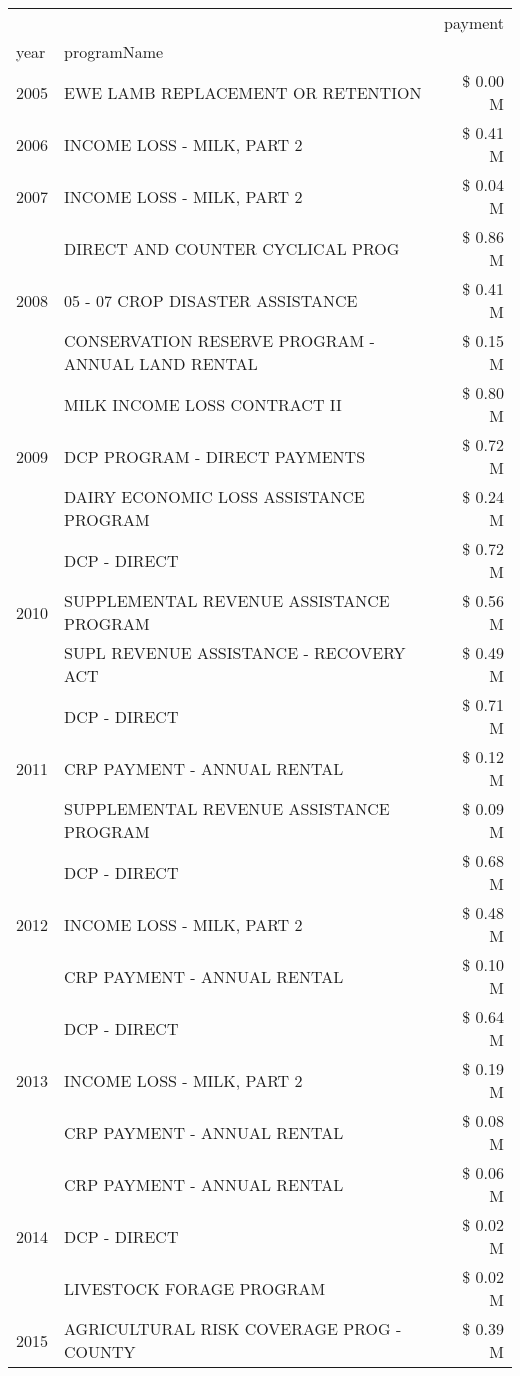 \begin{tabular}{llr}
\toprule
 &  & payment \\
year & programName &  \\
\midrule
2005 & EWE LAMB REPLACEMENT OR RETENTION & \$ 0.00 M \\
\cline{1-3}
2006 & INCOME LOSS - MILK, PART 2 & \$ 0.41 M \\
\cline{1-3}
2007 & INCOME LOSS - MILK, PART 2 & \$ 0.04 M \\
\cline{1-3}
\multirow[t]{3}{*}{2008} & DIRECT AND COUNTER CYCLICAL PROG & \$ 0.86 M \\
 & 05 - 07 CROP DISASTER ASSISTANCE & \$ 0.41 M \\
 & CONSERVATION RESERVE PROGRAM - ANNUAL LAND RENTAL & \$ 0.15 M \\
\cline{1-3}
\multirow[t]{3}{*}{2009} & MILK INCOME LOSS CONTRACT II & \$ 0.80 M \\
 & DCP PROGRAM - DIRECT PAYMENTS & \$ 0.72 M \\
 & DAIRY ECONOMIC LOSS ASSISTANCE PROGRAM & \$ 0.24 M \\
\cline{1-3}
\multirow[t]{3}{*}{2010} & DCP - DIRECT & \$ 0.72 M \\
 & SUPPLEMENTAL REVENUE ASSISTANCE PROGRAM & \$ 0.56 M \\
 & SUPL REVENUE ASSISTANCE - RECOVERY ACT & \$ 0.49 M \\
\cline{1-3}
\multirow[t]{3}{*}{2011} & DCP - DIRECT & \$ 0.71 M \\
 & CRP PAYMENT - ANNUAL RENTAL & \$ 0.12 M \\
 & SUPPLEMENTAL REVENUE ASSISTANCE PROGRAM & \$ 0.09 M \\
\cline{1-3}
\multirow[t]{3}{*}{2012} & DCP - DIRECT & \$ 0.68 M \\
 & INCOME LOSS - MILK, PART 2 & \$ 0.48 M \\
 & CRP PAYMENT - ANNUAL RENTAL & \$ 0.10 M \\
\cline{1-3}
\multirow[t]{3}{*}{2013} & DCP - DIRECT & \$ 0.64 M \\
 & INCOME LOSS - MILK, PART 2 & \$ 0.19 M \\
 & CRP PAYMENT - ANNUAL RENTAL & \$ 0.08 M \\
\cline{1-3}
\multirow[t]{3}{*}{2014} & CRP PAYMENT - ANNUAL RENTAL & \$ 0.06 M \\
 & DCP - DIRECT & \$ 0.02 M \\
 & LIVESTOCK FORAGE PROGRAM & \$ 0.02 M \\
\cline{1-3}
\multirow[t]{3}{*}{2015} & AGRICULTURAL RISK COVERAGE PROG - COUNTY & \$ 0.39 M \\

\end{tabular}

